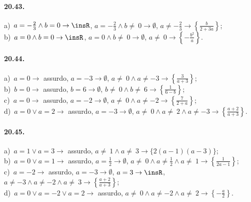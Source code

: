 \paragraph{20.43.}
a)~$a=-{\frac{2}{3}}\wedge b=0 \rightarrow \insR$, $a=-{\frac{2}{3}}\wedge b\neq~0 \rightarrow \emptyset$, $a\neq -{\frac{2}{3}} \rightarrow \left\{\frac{b}{2+3a}\right\}$;
\protect\\ b)~$a=0\wedge b=0 \rightarrow \insR$, $a=0\wedge b\neq~0 \rightarrow \emptyset$, $a\neq~0 \rightarrow \left\{-{\frac{b^{2}}{a}}\right\}$.

\paragraph{20.44.}
a)~$a=0 \rightarrow$ assurdo, $a=-3 \rightarrow \emptyset$, $a\neq~0\wedge a\neq -3 \rightarrow \left\{\frac{3}{a+3}\right\}$;
\protect\\ b)~$b=0 \rightarrow$ assurdo, $b=6 \rightarrow \emptyset$, $b\neq~0\wedge b\neq~6 \rightarrow \left\{\frac{1}{6-b}\right\}$;
\protect\\ c)~$a=0 \rightarrow$ assurdo, $a=-2 \rightarrow \emptyset$, $a\neq~0\wedge a\neq -2 \rightarrow \left\{\frac{7}{2+a}\right\}$;
\protect\\ d)~$a=0\vee a=2 \rightarrow$ assurdo, $a=-3 \rightarrow \emptyset$, $a\neq~0\wedge a\neq~2\wedge a\neq -3 \rightarrow \left\{\frac{a+2}{a+3}\right\}$.

\paragraph{20.45.}
a)~$a=1\vee a=3 \rightarrow$ assurdo, $a\neq~1\wedge a\neq~3 \rightarrow \{2(a-1)(a-3)\}$;
\protect\\ b)~$a=0\vee a=1 \rightarrow$ assurdo, $a=\frac{1}{2} \rightarrow \emptyset$, $a\neq~0\wedge a\neq \frac{1}{2}\wedge a\neq~1 \rightarrow \left\{\frac{1}{2a-1}\right\}$;
\protect\\ c)~$a=-2 \rightarrow$ assurdo, $a=-3 \rightarrow \emptyset$, $a=3 \rightarrow \insR$, $a\neq -3\wedge a\neq -2\wedge a\neq~3 \rightarrow \left\{\frac{a+2}{a+3}\right\}$;
\protect\\ d)~$a=0\vee a=-2\vee a=2 \rightarrow$ assurdo, $a\neq~0\wedge a\neq -2\wedge a\neq~2 \rightarrow \left\{-{\frac{a}{2}}\right\}$.

